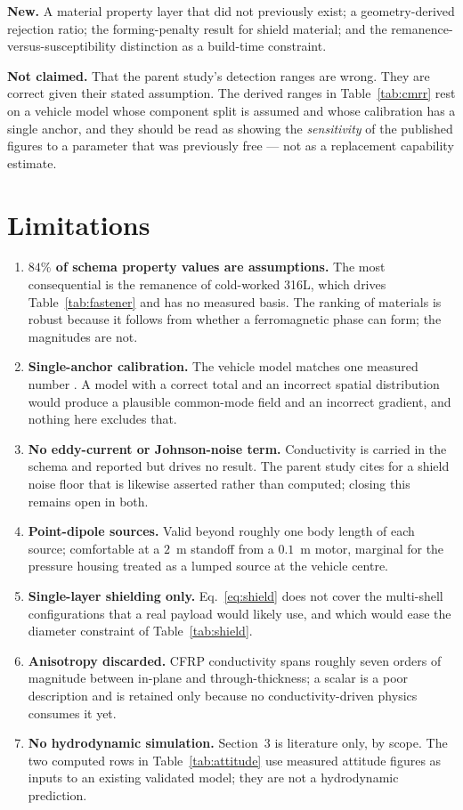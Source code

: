 \documentclass[11pt]{article}
\begin{document}
\textbf{New.} A material property layer that did not previously exist; a
geometry-derived rejection ratio; the forming-penalty result for shield material;
and the remanence-versus-susceptibility distinction as a build-time constraint.

\textbf{Not claimed.} That the parent study's detection ranges are wrong. They
are correct given their stated assumption. The derived ranges in
Table~\ref{tab:cmrr} rest on a vehicle model whose component split is assumed and
whose calibration has a single anchor, and they should be read as showing the
\emph{sensitivity} of the published figures to a parameter that was previously
free --- not as a replacement capability estimate.

\section{Limitations}
\begin{enumerate}[leftmargin=1.5em]
\item \textbf{$84\%$ of schema property values are assumptions.} The most
consequential is the remanence of cold-worked 316L, which drives
Table~\ref{tab:fastener} and has no measured basis. The ranking of materials is
robust because it follows from whether a ferromagnetic phase can form; the
magnitudes are not.
\item \textbf{Single-anchor calibration.} The vehicle model matches one measured
number \cite{oehler2024}. A model with a correct total and an incorrect spatial
distribution would produce a plausible common-mode field and an incorrect
gradient, and nothing here excludes that.
\item \textbf{No eddy-current or Johnson-noise term.} Conductivity is carried in
the schema and reported but drives no result. The parent study cites
\cite{lee2008} for a shield noise floor that is likewise asserted rather than
computed; closing this remains open in both.
\item \textbf{Point-dipole sources.} Valid beyond roughly one body length of each
source; comfortable at a $2$~m standoff from a $0.1$~m motor, marginal for the
pressure housing treated as a lumped source at the vehicle centre.
\item \textbf{Single-layer shielding only.} Eq.~\eqref{eq:shield} does not cover
the multi-shell configurations \cite{sumner1987} that a real payload would
likely use, and which would ease the diameter constraint of
Table~\ref{tab:shield}.
\item \textbf{Anisotropy discarded.} CFRP conductivity spans roughly seven orders
of magnitude between in-plane and through-thickness; a scalar is a poor
description and is retained only because no conductivity-driven physics consumes
it yet.
\item \textbf{No hydrodynamic simulation.} Section~3 is literature only, by
scope. The two computed rows in Table~\ref{tab:attitude} use measured attitude
figures as inputs to an existing validated model; they are not a hydrodynamic
prediction.
\end{enumerate}
\end{document}
